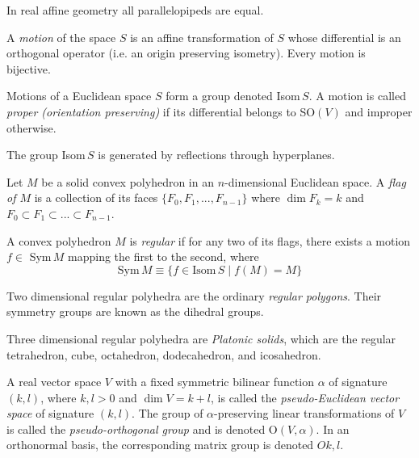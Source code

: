 \documentclass{article}
\begin{document}
    \begin{corollary}
    In real affine geometry all parallelopipeds are equal. 
    \end{corollary}

    \begin{definition}
    A \textit{motion} of the space $S$ is an affine transformation of $S$ whose differential is an orthogonal operator (i.e. an origin preserving isometry). Every motion is bijective. 
    \end{definition}

    Motions of a Euclidean space $S$ form a group denoted Isom$\,S$. A motion is called \textit{proper (orientation preserving)} if its differential belongs to SO$(V)$ and improper otherwise. 

    \begin{lemma}
    The group Isom$\,S$ is generated by reflections through hyperplanes. 
    \end{lemma}

    \begin{definition}
    Let $M$ be a solid convex polyhedron in an $n$-dimensional Euclidean space. A \textit{flag of $M$} is a collection of its faces $\{F_0, F_1, ..., F_{n-1}\}$ where $\dim{F_k} = k$ and $F_0 \subset F_1 \subset ... \subset F_{n-1}$. 
    \end{definition}

    \begin{definition}
    A convex polyhedron $M$ is \textit{regular} if for any two of its flags, there exists a motion $f \in$ Sym$\,M$ mapping the first to the second, where 
    \[\text{Sym}\,M \equiv \{f \in \text{Isom}\,S \;|\; f(M) = M \}\]
    \end{definition}

    Two dimensional regular polyhedra are the ordinary \textit{regular polygons}. Their symmetry groups are known as the dihedral groups.

    Three dimensional regular polyhedra are \textit{Platonic solids}, which are the regular tetrahedron, cube, octahedron, dodecahedron, and icosahedron. 

    \begin{definition}
    A real vector space $V$ with a fixed symmetric bilinear function $\alpha$ of signature $(k, l)$, where $k, l > 0$ and $\dim{V} = k+l$, is called the \textit{pseudo-Euclidean vector space} of signature $(k, l)$. The group of $\alpha$-preserving linear transformations of $V$ is called the \textit{pseudo-orthogonal group} and is denoted O$(V, \alpha)$. In an orthonormal basis, the corresponding matrix group is denoted $O{k,l}$. 
    \end{definition}
\end{document}
